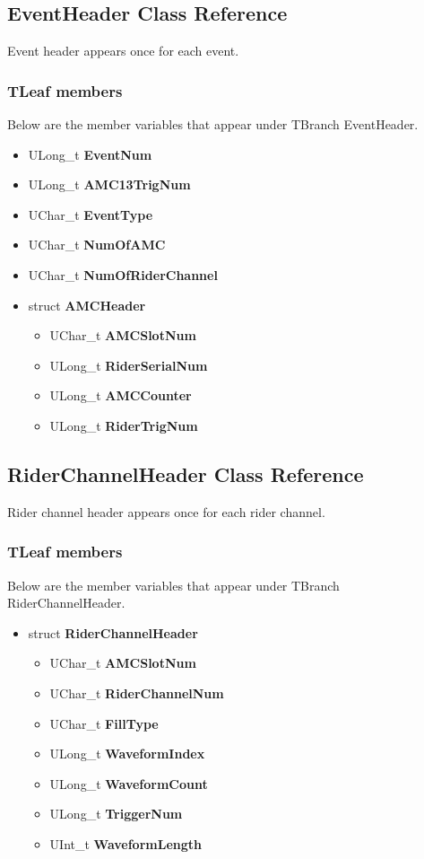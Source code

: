 \documentclass[12pt,letterpaper]{article}
\begin{document}
\subsection{EventHeader Class Reference}
Event header appears once for each event.

\subsubsection*{TLeaf members}

Below are the member variables that appear under TBranch EventHeader.

\begin{itemize}
\item ULong\_t \textbf{EventNum}
\item ULong\_t \textbf{AMC13TrigNum}
\item UChar\_t \textbf{EventType}
\item UChar\_t \textbf{NumOfAMC}
\item UChar\_t \textbf{NumOfRiderChannel}
\item struct \textbf{AMCHeader} 
    \begin{itemize}
    \item UChar\_t \textbf{AMCSlotNum}  
    \item ULong\_t  \textbf{RiderSerialNum}  
    \item ULong\_t \textbf{AMCCounter}
    \item ULong\_t \textbf{RiderTrigNum}
    \end{itemize} 
\end{itemize}

\subsection{RiderChannelHeader Class Reference} 
Rider channel header appears once for each rider channel.

\subsubsection*{TLeaf members}

Below are the member variables that appear under TBranch RiderChannelHeader.

\begin{itemize}
\item struct \textbf{RiderChannelHeader}
      \begin{itemize}
    \item UChar\_t \textbf{AMCSlotNum}
    \item UChar\_t \textbf{RiderChannelNum}
    \item UChar\_t \textbf{FillType}
     \item ULong\_t \textbf{WaveformIndex}
    \item ULong\_t \textbf{WaveformCount}
    \item ULong\_t \textbf{TriggerNum}
    \item UInt\_t \textbf{WaveformLength}
    \end{itemize}
\end{itemize}
\end{document}
